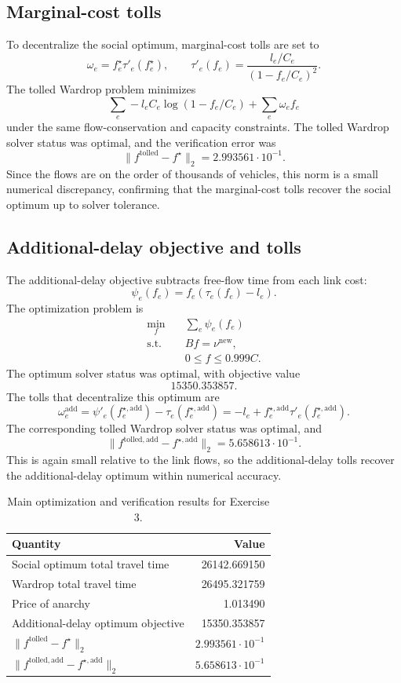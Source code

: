 \documentclass[11pt,a4paper]{article}
\begin{document}
\subsection*{Marginal-cost tolls}

To decentralize the social optimum, marginal-cost tolls are set to
\[
\omega_e=f^{\star}_e \tau'_e(f^{\star}_e),
\qquad
\tau'_e(f_e)=\frac{l_e/C_e}{(1-f_e/C_e)^2}.
\]
The tolled Wardrop problem minimizes
\[
\sum_e -l_e C_e\log(1-f_e/C_e)+\sum_e \omega_e f_e
\]
under the same flow-conservation and capacity constraints. The tolled Wardrop
solver status was \(\mathrm{optimal}\), and the verification error was
\[
\|f^{\mathrm{tolled}}-f^\star\|_2=2.993561\cdot 10^{-1}.
\]
Since the flows are on the order of thousands of vehicles, this norm is a
small numerical discrepancy, confirming that the marginal-cost tolls recover
the social optimum up to solver tolerance.

\subsection*{Additional-delay objective and tolls}

The additional-delay objective subtracts free-flow time from each link cost:
\[
\psi_e(f_e)=f_e(\tau_e(f_e)-l_e).
\]
The optimization problem is
\[
\begin{aligned}
\min_f \quad & \sum_e \psi_e(f_e)\\
\text{s.t.}\quad & Bf=\nu^{\mathrm{new}},\\
&0\leq f\leq 0.999C .
\end{aligned}
\]
The optimum solver status was \(\mathrm{optimal}\), with objective value
\[
15350.353857.
\]
The tolls that decentralize this optimum are
\[
\omega^{\mathrm{add}}_e
=\psi'_e(f^{\star,\mathrm{add}}_e)-\tau_e(f^{\star,\mathrm{add}}_e)
=-l_e+f^{\star,\mathrm{add}}_e\tau'_e(f^{\star,\mathrm{add}}_e).
\]
The corresponding tolled Wardrop solver status was \(\mathrm{optimal}\), and
\[
\|f^{\mathrm{tolled,add}}-f^{\star,\mathrm{add}}\|_2
=5.658613\cdot 10^{-1}.
\]
This is again small relative to the link flows, so the additional-delay tolls
recover the additional-delay optimum within numerical accuracy.

\begin{table}[h]
\centering
\begin{tabular}{l|r}
\hline
Quantity & Value\\
\hline
Social optimum total travel time & 26142.669150\\
Wardrop total travel time & 26495.321759\\
Price of anarchy & 1.013490\\
Additional-delay optimum objective & 15350.353857\\
\(\|f^{\mathrm{tolled}}-f^\star\|_2\) & \(2.993561\cdot 10^{-1}\)\\
\(\|f^{\mathrm{tolled,add}}-f^{\star,\mathrm{add}}\|_2\) &
\(5.658613\cdot 10^{-1}\)\\
\hline
\end{tabular}
\caption{Main optimization and verification results for Exercise 3.}
\label{tab:exercise3-summary}
\end{table}
\end{document}
